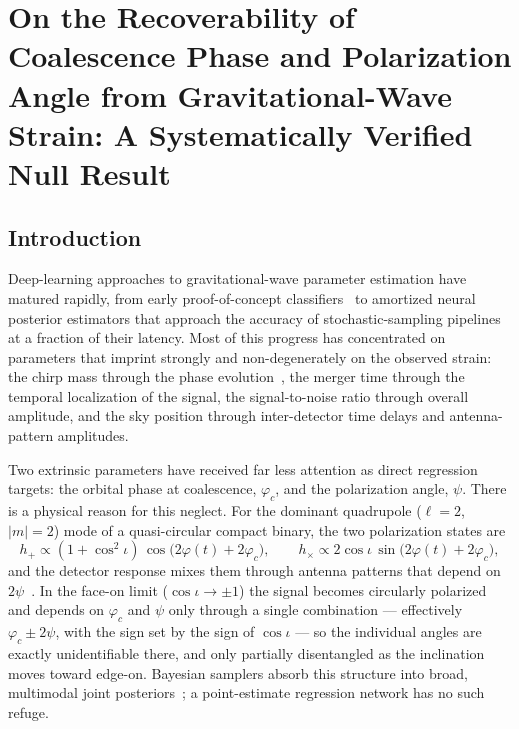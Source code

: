 \usepackage{geometry}
\usepackage{graphicx}
\usepackage{amssymb}
\usepackage{amsfonts}
\usepackage{booktabs}
\usepackage{amsopn}
\usepackage{amsmath}
\usepackage{amstext}



\chapter{On the Recoverability of Coalescence Phase and Polarization Angle from Gravitational-Wave Strain: A Systematically Verified Null Result}
\label{ch:phic-psi-degeneracy}


\section{Introduction}
\label{sec:phicpsi:intro}

Deep-learning approaches to gravitational-wave parameter estimation have matured rapidly, from early proof-of-concept classifiers~\cite{george2018deep} to amortized neural posterior estimators that approach the accuracy of stochastic-sampling pipelines~\cite{gabbard2022vitamin,dax2021dingo} at a fraction of their latency.
Most of this progress has concentrated on parameters that imprint strongly and non-degenerately on the observed strain: the chirp mass through the phase evolution~\cite{cutler1994gw}, the merger time through the temporal localization of the signal, the signal-to-noise ratio through overall amplitude, and the sky position through inter-detector time delays and antenna-pattern amplitudes.

Two extrinsic parameters have received far less attention as direct regression targets: the orbital phase at coalescence, $\varphi_c$, and the polarization angle, $\psi$.
There is a physical reason for this neglect.
For the dominant quadrupole ($\ell=2$, $|m|=2$) mode of a quasi-circular compact binary, the two polarization states are
\begin{equation}
    h_+ \propto (1+\cos^2\iota)\,\cos\!\bigl(2\varphi(t)+2\varphi_c\bigr),
    \qquad
    h_\times \propto 2\cos\iota\,\sin\!\bigl(2\varphi(t)+2\varphi_c\bigr),
\end{equation}
and the detector response mixes them through antenna patterns that depend on $2\psi$~\cite{cutler1994gw,sathyaprakash2009physics}.
In the face-on limit ($\cos\iota \to \pm 1$) the signal becomes circularly polarized and depends on $\varphi_c$ and $\psi$ only through a single combination --- effectively $\varphi_c \pm 2\psi$, with the sign set by the sign of $\cos\iota$ --- so the individual angles are exactly unidentifiable there, and only partially disentangled as the inclination moves toward edge-on.
Bayesian samplers absorb this structure into broad, multimodal joint posteriors~\cite{veitch2015lalinference}; a point-estimate regression network has no such refuge.

